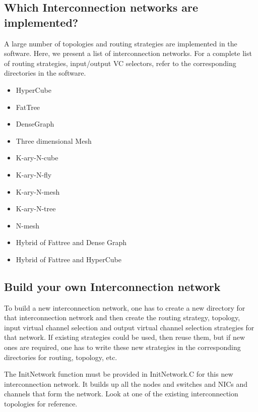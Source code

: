 \subsection{Which Interconnection networks are implemented?}
A large number of topologies and routing strategies are implemented in the
software. Here, we present a list of interconnection networks. For a complete
list of routing strategies, input/output VC selectors, refer to the
corresponding directories in the software.

\begin{itemize}
\item HyperCube
\item FatTree
\item DenseGraph
\item Three dimensional Mesh
\item K-ary-N-cube
\item K-ary-N-fly
\item K-ary-N-mesh
\item K-ary-N-tree
\item N-mesh
\item Hybrid of Fattree and Dense Graph
\item Hybrid of Fattree and HyperCube
\end{itemize}

\subsection{Build your own Interconnection network}
To build a new interconnection network, one has to create a new directory for
that interconnection network and then create the routing strategy, topology,
input virtual channel selection and output virtual channel selection strategies
for that network. If existing strategies could be used, then reuse them, but if
new ones are required, one has to write these new strategies in the
corresponding directories for routing, topology, etc.

The InitNetwork function must be provided in InitNetwork.C for this new
interconnection network. It builds up all the nodes and switches and NICs and
channels that form the network. Look at one of the existing interconnection
topologies for reference.

